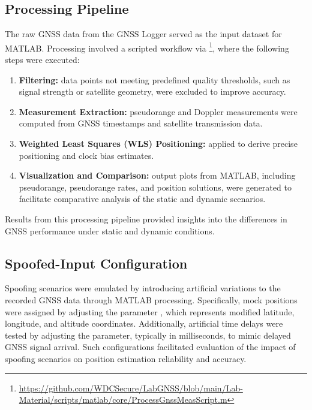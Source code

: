     \subsection{Processing Pipeline}
    
        The raw GNSS data from the GNSS Logger served as the input dataset for MATLAB. 
        Processing involved a scripted workflow via \footnote{\url{https://github.com/WDCSecure/LabGNSS/blob/main/Lab-Material/scripts/matlab/core/ProcessGnssMeasScript.m}}, where the following steps were executed:
        
        \begin{enumerate}
            \item \textbf{Filtering:} data points not meeting predefined quality thresholds, such as signal strength or satellite geometry, were excluded to improve accuracy.
            \item \textbf{Measurement Extraction:} pseudorange and Doppler measurements were computed from GNSS timestamps and satellite transmission data.
            \item \textbf{Weighted Least Squares (WLS) Positioning:} applied to derive precise positioning and clock bias estimates.
            \item \textbf{Visualization and Comparison:} output plots from MATLAB, including pseudorange, pseudorange rates, and position solutions, were generated to facilitate comparative analysis of the static and dynamic scenarios.
        \end{enumerate}

        \noindent Results from this processing pipeline provided insights into the differences in GNSS performance under static and dynamic conditions.
    
    \subsection{Spoofed-Input Configuration}

        Spoofing scenarios were emulated by introducing artificial variations to the recorded GNSS data through MATLAB processing. 
        Specifically, mock positions were assigned by adjusting the parameter , which represents modified latitude, longitude, and altitude coordinates. 
        Additionally, artificial time delays were tested by adjusting the  parameter, typically in milliseconds, to mimic delayed GNSS signal arrival. 
        Such configurations facilitated evaluation of the impact of spoofing scenarios on position estimation reliability and accuracy.

